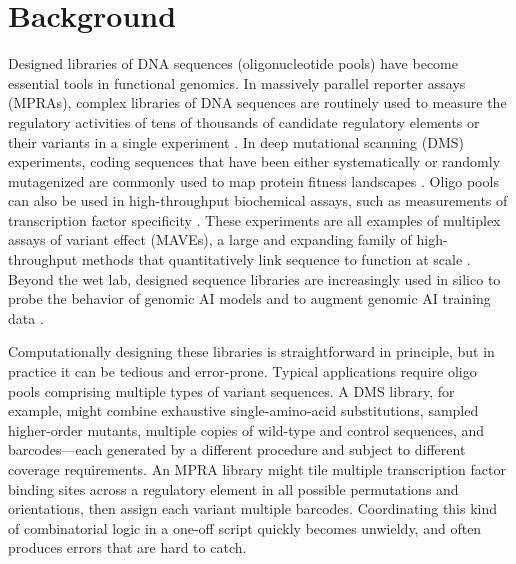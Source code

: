 \section*{Background}\label{sec:background}

Designed libraries of DNA sequences (oligonucleotide pools) have become essential tools in functional genomics. In massively parallel reporter assays (MPRAs), complex libraries of DNA sequences are routinely used to measure the regulatory activities of tens of thousands of candidate regulatory elements or their variants in a single experiment \citep{Patwardhan2009cw, Kinney2010tn, Melnikov2012dw, Kwasnieski2012hu, Sharon2012io, Mogno2013cf, Levo2014hl, Inoue2015cs, Vvedenskaya2015ih, Urtecho2018hu, Klein2020, Romero2023, LaFleur2024aa}. In deep mutational scanning (DMS) experiments, coding sequences that have been either systematically or randomly mutagenized are commonly used to map protein fitness landscapes \citep{Fowler2010gt, Hietpas2011bp, Fowler2014gq, Olson2014iq, Adams2016dka, Findlay2018kd, Starr2020aa}. Oligo pools can also be used in high-throughput biochemical assays, such as measurements of transcription factor specificity \citep{Berger2006wp, Maerkl2007tv, Noyes2008vr, Gordan2013, Le2018cr, Shen2018ip, Khetan2025_paditseq}. These experiments are all examples of multiplex assays of variant effect (MAVEs), a large and expanding family of high-throughput methods that quantitatively link sequence to function at scale \citep{Kinney2019jc, Starita2017ec, Weile2018gm}. Beyond the wet lab, designed sequence libraries are increasingly used in silico to probe the behavior of genomic AI models \citep{Avsec2021bpnet, Toneyan2024creme, Seitz2024squid, Seitz2025, Nagai2026review} and to augment genomic AI training data \citep{Lee2023}.

Computationally designing these libraries is straightforward in principle, but in practice it can be tedious and error-prone. Typical applications require oligo pools comprising multiple types of variant sequences. A DMS library, for example, might combine exhaustive single-amino-acid substitutions, sampled higher-order mutants, multiple copies of wild-type and control sequences, and barcodes---each generated by a different procedure and subject to different coverage requirements. An MPRA library might tile multiple transcription factor binding sites across a regulatory element in all possible permutations and orientations, then assign each variant multiple barcodes. Coordinating this kind of combinatorial logic in a one-off script quickly becomes unwieldy, and often produces errors that are hard to catch.

